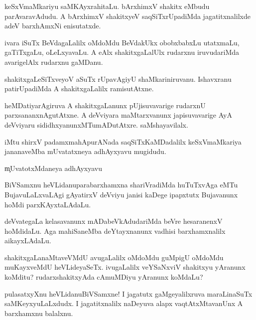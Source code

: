 \begin{mng}
keSxVmaMkariyu saMKAyxrahitaLu. bArxhimxV shakitx eMbudu parAvaravAdudu. A bArxhimxV shakitxyeV saqSiTxrUpadiMda jagatitxnalilxde adeV barxhAmxNi enisutatxde.
\end{mng}

\begin{mng}
ivara iSuTx BeVdagaLalilx oMdoMdu BeVdakUkx obobxbabxLu utatxmaLu, gaTiTxgaLu, oLeLxyavaLu. A eAlx shakitxgaLalUlx rudarxnu iruvudariMda avarigelAlx rudarxnu gaMDanu.
\end{mng}

\begin{mng}
shakitxgaLeSiTxveyoV aSuTx rUpavAgiyU shaMkariniruvanu. Ishavxranu patirUpadiMda A shakitxgaLalilx ramisutAtxne.
\end{mng}

\begin{mng}
heMDatiyarAgiruva A shakitxgaLanunx pUjisuvavarige rudarxnU parxsananxnAgutAtxne. A deVviyara maMtarxvanunx japisuvavarige AyA deVviyaru sididhxyanunxMTumADutAtxre. saMshayavilalx.
\end{mng}

\begin{mng}
iMtu shirxV padamxmahApurANada saqSiTxKaMDadalilx keSxVmaMkariya jananaveMba mUvatatxneya adhAyxyavu mugidudu.
\end{mng}

\begin{mng}
\c{mUvatotxMdaneya adhAyxyavu}
\end{mng}

\begin{mng}
BiVSamxnu heVLidanu\mdash parabarxhamxna shariVradiMda huTuTxvAga eMTu BujavuLaLxvaLAgi gAyatirxV deVviyu janisi kaDege ipapxtutx Bujavanunx hoMdi parxKAyxtaLAdaLu.
\end{mng}

\begin{mng}
deVvategaLa kelasavanunx mADabeVkAdudariMda beVre hesaranenxV hoMdidaLu. Aga mahiSaneMba deYtayxnanunx vadhisi barxhamxnalilx aikayxLAdaLu.
\end{mng}

\begin{mng}
shakitxgaLanaMtaveVMdU avugaLalilx oMdoMdu guMpigU oMdoMdu muKayxveMdU heVLideyaSeTx. ivugaLalilx veYSaNxviV shakitxyu yAranunx koMditu? rudarxshakitxyAda cAmuMDiyu yAranunx koMdaLu?
\end{mng}

\begin{mng}
pulasatxyXnu heVLidanu\mdash BiVSamxne! I jagatutx gaMgeyalilxruva maraLinaSuTx saMKeyxyuLaLxdudx. I jagatitxnalilx naDeyuva alapx vaqtAtxMtavanUnx A barxhamxnu balalxnu.
\end{mng}

